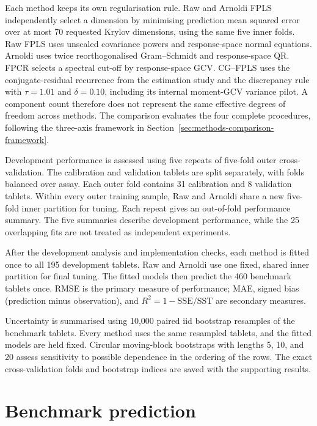 Each method keeps its own regularisation rule.  Raw and Arnoldi FPLS
independently select a dimension by minimising prediction mean squared error over at most
70 requested Krylov dimensions, using the same five inner folds.  Raw FPLS
uses unscaled covariance powers and response-space normal equations.
Arnoldi uses twice reorthogonalised Gram--Schmidt and response-space QR.
FPCR selects a spectral cut-off by response-space GCV.  CG--FPLS uses the
conjugate-residual recurrence from the estimation study and the discrepancy
rule with $\tau=1.01$ and $\delta=0.10$, including its internal moment-GCV
variance pilot.  A component count therefore does not represent the same
effective degrees of freedom across methods.  The comparison evaluates the
four complete procedures, following the three-axis framework in
Section~\ref{sec:methods-comparison-framework}.

Development performance is assessed using five repeats of five-fold outer
cross-validation.  The calibration and validation tablets are split
separately, with folds balanced over assay.  Each outer fold contains
31 calibration and 8 validation tablets.  Within every outer training
sample, Raw and Arnoldi share a new five-fold inner partition for tuning.
Each repeat gives an out-of-fold performance summary.  The five summaries
describe development performance, while the 25 overlapping fits are not
treated as independent experiments.

After the development analysis and implementation checks, each method is
fitted once to all 195 development tablets.  Raw and Arnoldi use one fixed,
shared inner partition for final tuning.  The fitted models then predict
the 460 benchmark tablets once.  RMSE is the primary measure of performance;
MAE, signed bias (prediction minus observation), and
$R^2=1-\mathrm{SSE}/\mathrm{SST}$ are secondary measures.

Uncertainty is summarised using 10,000 paired iid bootstrap resamples of
the benchmark tablets.  Every method uses the same resampled tablets,
and the fitted models are held fixed.  Circular moving-block bootstraps
with lengths 5, 10, and 20 assess sensitivity to possible dependence in
the ordering of the rows.  The exact cross-validation folds and bootstrap
indices are saved with the supporting results.

\section{Benchmark prediction}
\label{sec:spectroscopy-benchmark}

